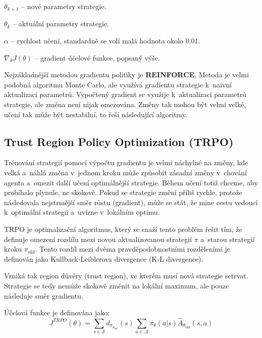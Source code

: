 \begin{myitemize}
  \item $\theta_{k+1}$ -- nové parametry strategie.
  \item $\theta_k$ -- aktuální parametry strategie.
  \item $\alpha$ -- rychlost učení, standardně se volí malá hodnota okolo $0.01$.
  \item $\nabla_\theta J(\theta)$ -- gradient účelové funkce, popsaný výše.
\end{myitemize}

Nejzákladnější metodou gradientu politiky je \textbf{REINFORCE}.
Metoda je velmi podobná algoritmu Monte Carlo, ale využívá gradientu strategie k~naivní aktualizaci parametrů.
Vypočtený gradient se využije k~aktualizaci parametrů strategie, ale změna není nijak omezována.
Změny tak mohou být velmi velké, učení tak může být nestabilní, to řeší následující algoritmy.

\pagebreak

\subsection{Trust Region Policy Optimization (TRPO)}\label{sec:trust-region-policy-optimization}
Trénování strategií pomocí výpočtu gradientu je velmi náchylné na změny, kde velká a~náhlá změna v~jednom kroku může způsobit zásadní změny v~chování agenta a~omezit další učení optimálnější strategie.
Během učení totiž chceme, aby probíhalo plynule, ne skokově.
Pokud se strategie změní příliš rychle, protože následovala nejstrmější směr růstu (gradient), může se stát, že mine cestu vedoucí k~optimální strategii a~uvízne v~lokálním optimu.

TRPO je optimalizační algoritmus, který se snaží tento problém řešit tím, že definuje omezení rozdílu mezi novou aktualizovanou strategií \textbf{$\pi$} a~starou strategií kroku \textbf{$\pi_{\text{old}}$}.
Tento rozdíl mezi dvěma pravděpodobnostními rozděleními je definován jako Kullback-Leiblerova divergence (K-L divergence)\cite{KL_divergence}.

Vzniká tak region důvěry (trust region), ve kterém musí nová strategie setrvat.
Strategie se tedy nemůže skokově změnit na lokální maximum, ale pouze následuje směr gradientu.

Účelová funkce je definována jako:
\begin{equation}
  J^{TRPO}(\theta) = \sum_{s \in \mathcal{S}} d_{\pi_{\theta_{\text{old}}}}(s) \sum_{a \in \mathcal{A}} \pi_{\theta}(a \vert s) \hat{A}_{\theta_{\text{old}}}(s, a)
\end{equation}

